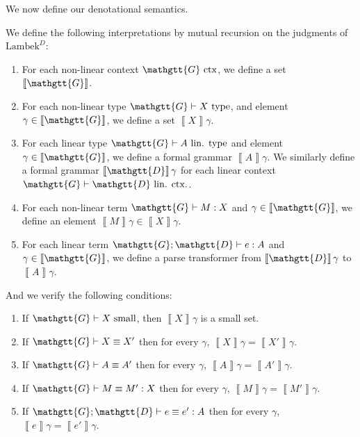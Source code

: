 \documentclass[acmsmall,nonacm]{acmart}
\renewcommand{\Gamma}{\mathgtt{G}}
\renewcommand{\Delta}{\mathgtt{D}}
\newcommand{\sem}[1]{\left\llbracket{#1}\right\rrbracket}
\newcommand{\theoryabbv}{$\textrm{Lambek}^D$\xspace}
\newcommand{\isTy}{\textrm{ type}}
\newcommand{\isCtx}{\textrm{ ctx}}
\newcommand{\isSmall}{\textrm{ small}}
\newcommand{\isLinTy}{\textrm{ lin. type}}
\newcommand{\isLinCtx}{\textrm{ lin. ctx.}}
\newcommand{\linctxwff}[2]{#1 \vdash #2 \isLinCtx}
\begin{document}
{We now define our denotational semantics.
\begin{definition}
  We define the following interpretations by mutual recursion on the
  judgments of \theoryabbv:
  \begin{enumerate}
  \item For each non-linear context $\Gamma \isCtx$, we define a set $\sem \Gamma$.
  \item For each non-linear type $\Gamma \vdash X \isTy$, and element
    $\gamma \in \sem\Gamma$, we define a set $\sem X \gamma$.
  \item For each linear type $\Gamma \vdash A \isLinTy$ and element $\gamma
    \in \sem\Gamma$, we define a formal grammar $\sem{A}\gamma$. We
    similarly define a formal grammar $\sem\Delta\gamma$ for each
    linear context $\linctxwff \Gamma \Delta$.
  \item For each non-linear term $\Gamma \vdash M : X$ and $\gamma \in \sem{\Gamma}$, we define an element $\sem{M}\gamma \in \sem{X}\gamma$.
  \item For each linear term $\Gamma; \Delta \vdash e : A$ and $\gamma \in \sem{\Gamma}$, we define a parse transformer from $\sem{\Delta}\gamma$ to $\sem{A}\gamma$.
  \end{enumerate}
  And we verify the following conditions:
  \begin{enumerate}
  \item If $\Gamma \vdash X \isSmall$, then $\sem X \gamma$ is a small set.
  \item If $\Gamma \vdash X \equiv X'$ then for every $\gamma$, $\sem{X}\gamma = \sem{X'}\gamma$.
  \item If $\Gamma \vdash A \equiv A'$ then for every $\gamma$, $\sem{A}\gamma = \sem{A'}\gamma$.
  \item If $\Gamma \vdash M \equiv M' : X$ then for every $\gamma$, $\sem{M}\gamma = \sem{M'}\gamma$.
  \item If $\Gamma;\Delta \vdash e \equiv e' : A$ then for every $\gamma$, $\sem{e}\gamma = \sem{e'}\gamma$.
  \end{enumerate}
\end{definition}

}
\end{document}
